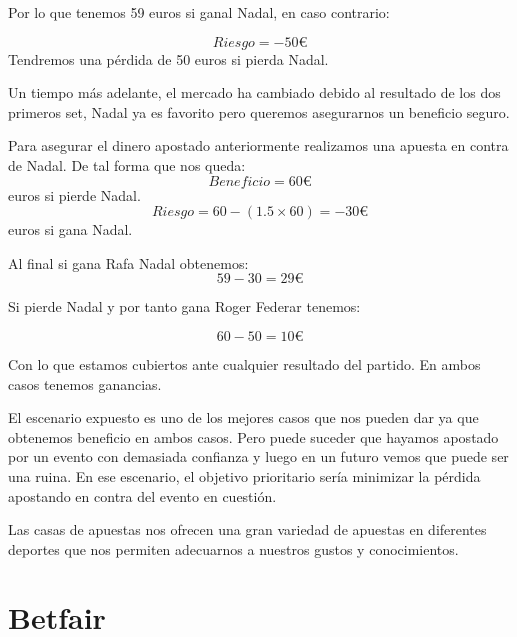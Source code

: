 Por lo que tenemos 59 euros si ganal Nadal, en caso contrario:
 
 \begin{displaymath}
  Riesgo = - 50 \euro 
\end{displaymath}
Tendremos una pérdida de 50 euros si pierda Nadal.
	
Un tiempo más adelante, el mercado ha cambiado debido al resultado de los dos primeros set, Nadal ya es favorito pero queremos asegurarnos un beneficio seguro.
  
Para asegurar el dinero apostado anteriormente realizamos una apuesta en contra de Nadal. De tal forma que nos queda:
  \begin{displaymath}
  Beneficio = 60 \euro 
  \end{displaymath} euros si pierde Nadal.
   \begin{displaymath}
  Riesgo = 60 - (1.5 \times 60) = -30 \euro
  \end{displaymath} euros si gana Nadal.
  
	 
Al final si gana Rafa Nadal obtenemos: 
   \begin{displaymath}
   59 - 30 = 29 \euro 
   \end{displaymath}
   
Si pierde Nadal y por tanto gana Roger Federar tenemos:
   
  \begin{displaymath}
  60 - 50 = 10 \euro
  \end{displaymath}
       
   Con lo que estamos cubiertos ante cualquier resultado del partido. En ambos casos tenemos ganancias. 
   
   El escenario expuesto es uno de los mejores casos que nos pueden dar ya que obtenemos beneficio en ambos casos. Pero puede suceder que hayamos apostado por un evento con demasiada confianza y luego en un futuro vemos que puede ser una ruina. En ese escenario, el objetivo prioritario sería minimizar la pérdida apostando en contra del evento en cuestión.

 Las casas de apuestas nos ofrecen una gran variedad de apuestas en diferentes deportes que nos permiten adecuarnos a nuestros gustos y conocimientos. 

   
\section{Betfair}

